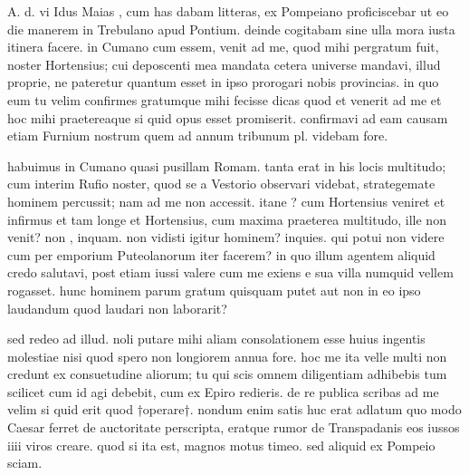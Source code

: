 


 A. d. vi Idus Maias , cum has dabam litteras, ex Pompeiano proficiscebar ut eo die manerem in Trebulano apud Pontium. deinde cogitabam sine ulla mora iusta itinera facere. in Cumano cum essem, venit ad me, quod mihi pergratum fuit, noster Hortensius; cui deposcenti mea mandata cetera universe mandavi, illud proprie, ne pateretur quantum esset in ipso prorogari nobis provincias. in quo eum tu velim confirmes gratumque mihi fecisse dicas quod et venerit ad me et hoc mihi praetereaque si quid opus esset promiserit. confirmavi ad eam causam etiam Furnium nostrum quem ad annum tribunum pl. videbam fore.

 habuimus in Cumano quasi pusillam Romam. tanta erat in his locis multitudo; cum interim Rufio noster, quod se a Vestorio observari videbat, strategemate hominem percussit; nam ad me non accessit. itane ? cum Hortensius veniret et infirmus et tam longe et Hortensius, cum maxima praeterea multitudo, ille non venit? non , inquam. non vidisti igitur hominem? inquies. qui potui non videre cum per emporium Puteolanorum iter facerem? in quo illum agentem aliquid credo salutavi, post etiam iussi valere cum me exiens e sua villa numquid vellem rogasset. hunc hominem parum gratum quisquam putet aut non in eo ipso laudandum quod laudari non laborarit?

 sed redeo ad illud. noli putare mihi aliam consolationem esse huius ingentis molestiae nisi quod spero non longiorem annua fore. hoc me ita velle multi non credunt ex consuetudine aliorum; tu qui scis omnem diligentiam adhibebis tum scilicet cum id agi debebit, cum ex Epiro redieris. de re publica scribas ad me velim si quid erit quod †operare†. nondum enim satis huc erat adlatum quo modo Caesar ferret de auctoritate perscripta, eratque rumor de Transpadanis eos iussos iiii viros creare. quod si ita est, magnos motus timeo. sed aliquid ex Pompeio sciam.
